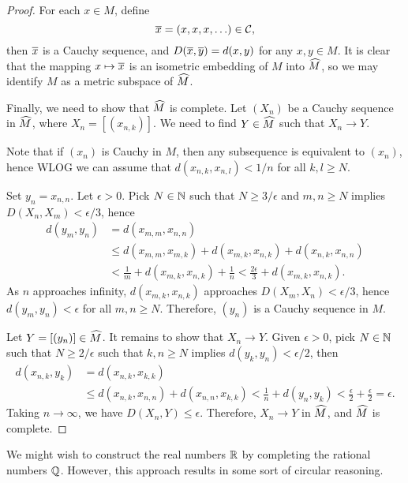 \begin{thm}
\begin{proof}
        For each $x\in M$, define
        \[
        \Bar x = (x, x, x, \ldots) \in \mathcal C,
        \]
        then $\Bar x$ is a Cauchy sequence, and $D(\Bar x, \Bar y) = d(x, y)$ for any $x, y\in M$. It is clear that the mapping $x\mapsto \Bar x$ is an isometric embedding of $M$ into $\Hat M$, so we may identify $M$ as a metric subspace of $\Hat M$.

        Finally, we need to show that $\Hat M$ is complete. Let $(X_n)$ be a Cauchy sequence in $\Hat M$, where $X_n = [(x_{n, k})]$. We need to find $Y\in \Hat M$ such that $X_n \to Y$.
        
        Note that if $(x_n)$ is Cauchy in $M$, then any subsequence is equivalent to $(x_n)$, hence WLOG we can assume that $d(x_{n, k}, x_{n, l}) < 1/n$ for all $k, l \geq N$. 
        
        Set $y_n = x_{n, n}$. Let $\epsilon > 0$. Pick $N\in \N$ such that $N \geq 3/\epsilon$ and $m, n \geq N$ implies $D(X_n, X_m) < \epsilon/3$, hence
        \begin{align*}
            d(y_m, y_n) &= d(x_{m, m}, x_{n, n}) \\
            &\leq d(x_{m, m}, x_{m, k}) + d(x_{m, k}, x_{n, k}) + d(x_{n, k}, x_{n, n}) \\
            &< \frac1m + d(x_{m, k}, x_{n, k}) + \frac1n < \frac{2\epsilon}3 + d(x_{m, k}, x_{n, k}).
        \end{align*}
        As $n$ approaches infinity, $d(x_{m, k}, x_{n, k})$ approaches $D(X_m, X_n) < \epsilon/3$, hence $d(y_m, y_n) < \epsilon$ for all $m, n \geq N$. Therefore, $(y_n)$ is a Cauchy sequence in $M$. 
        
        Let $Y = [(y_n)] \in \Hat M$. It remains to show that $X_n \to Y$. Given $\epsilon > 0$, pick $N\in \N$ such that $N \geq 2/\epsilon$ such that $k, n \geq N$ implies $d(y_k, y_n) < \epsilon/2$, then
        \begin{align*}
            d(x_{n, k}, y_k) &= d(x_{n, k}, x_{k, k}) \\
            &\leq d(x_{n, k}, x_{n, n}) + d(x_{n, n}, x_{k, k}) < \frac1n + d(y_n, y_k) < \frac\epsilon2 + \frac\epsilon2 = \epsilon.
        \end{align*}
        Taking $n\to\infty$, we have $D(X_n, Y) \leq \epsilon$. Therefore, $X_n \to Y$ in $\Hat M$, and $\Hat M$ is complete.
    \end{proof}
\end{thm}

We might wish to construct the real numbers $\R$ by completing the rational numbers $\Q$. However, this approach results in some sort of circular reasoning. 

